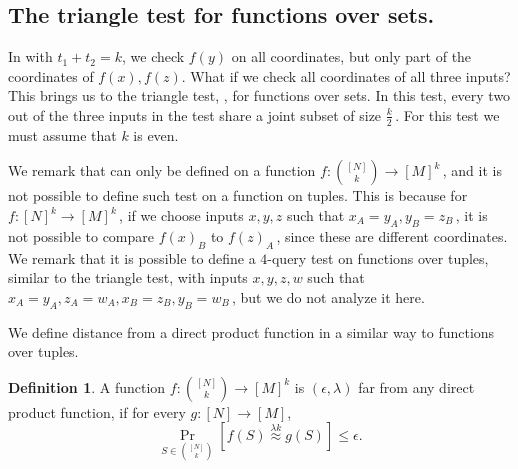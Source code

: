 \documentclass[11pt]{article}
\numberwithin{equation}{section}
\theoremstyle{definition}
\newtheorem{definition}[theorem]{Definition}
\theoremstyle{plain}
\newcommand\f{f} %
\newcommand{\g}{g} %
\newcommand\neql[1]{\stackrel{{#1}}{ \approx}} %
\newcommand{\sets}{\binom{[N]}{k}} %
\begin{document}
\subsection{The triangle test for functions over sets.}
In  with $t_1+t_2=k$, we check $\f(y)$ on all coordinates, but only part of the coordinates of $\f(x),\f(z)$. What if we check all coordinates of all three inputs? This brings us to the triangle test, , for functions over sets. In this test, every two out of the three inputs in the test share a joint subset of size $\frac{k}{2}$\,. For this test we must assume that $k$ is even.

We remark that  can only be defined on a function $\f:\sets\rightarrow[M]^k$\,, and it is not possible to define such test on a function on tuples. This is because for $\f:[N]^k\rightarrow[M]^k$\,, if we choose inputs $x,y,z$ such that $x_A=y_A,y_B=z_B$\,, it is not possible to compare $\f(x)_B$ to $\f(z)_A$\,, since these are different coordinates. We remark that it is possible to define a $4$-query test on functions over tuples, similar to the triangle test, with inputs $x,y,z,w$ such that $x_A = y_A,z_A = w_A, x_B = z_B, y_B = w_B$\,, but we do not analyze it here.

We define distance from a direct product function in a similar way to functions over tuples.
\begin{definition}
    A function $\f:\sets\rightarrow[M]^k$ is $(\epsilon,\lambda)$ far from any direct product function, if for every $\g:[N]\rightarrow[M]$,
    \[ \Pr_{S\in\sets}[\f(S)\neql{\lambda k}\g(S)]\leq\epsilon. \]
\end{definition}
\end{document}
